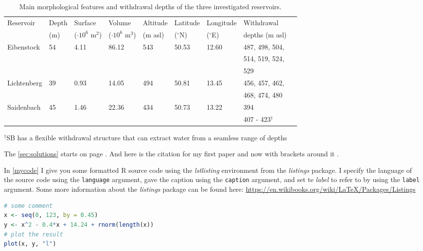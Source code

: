 \documentclass{article}
\numberwithin{equation}{section}
\begin{document}
	\begin{table}[b]
	\centering
	\caption{Main morphological features and withdrawal depths of the three investigated reservoirs.}
	\label{tab:mytable}
	\tiny
	\begin{tabular}{lllllllll}\hline
		Reservoir    & Depth & Surface   & Volume     & Altitude & Latitude    &
		Longitude  & Withdrawal \\
		&   	 (m)	 &	 ($\cdot 10^6$ m$^2$)     & ($\cdot10^6$ m$^3$)    &  (m asl)   &
		($^\circ$N) & ($^\circ$E) & depths (m asl)\\ \hline
		Eibenstock   &  54          & 4.11        & 86.12  & 543          & 50.53     & 12.60    & 487, 498, 504,  \\
		&&&&&&& 514, 519, 524,\\
		&&&&&&&  529\\
		Lichtenberg  &  39          & 0.93        & 14.05  &  494         & 50.81     & 13.45    & 456, 457, 462, \\
		&&&&&&& 468, 474, 480\\
		Saidenbach   &  45          & 1.46        & 22.36  &  434          & 50.73     & 13.22    & 394 \\
		&&&&&&& 407 - 423$^\dagger$\\ \hline
	\end{tabular}

	\raggedright

	{\tiny $^\dagger$SB has a flexible withdrawal structure that can extract water from a
		seamless range of depths}
\end{table}


The \autoref{sec:solutions} starts on page \pageref{sec:solutions}. And here is the citation for my first paper \citet{feldbauer_managing_2020} and now with brackets around it \citep{feldbauer_managing_2020}.


In \autoref{mycode} I give you some formatted R source code using the \textit{lstlisting} environment from the \textit{listings} package. I specify the language of the source code using the \texttt{language} argument, gave the caption using the \texttt{caption} argument, and set te \textit{label} to refer to by using the \texttt{label} argument. Some more information about the \textit{listings} package can be found here: \url{https://en.wikibooks.org/wiki/LaTeX/Packages/Listings}

\begin{lstlisting}[language=R, frame=single, caption=some code in R, label=mycode]
# some comment
x <- seq(0, 123, by = 0.45)
y <- x^2 - 0.4*x + 14.24 + rnorm(length(x))
# plot the result
plot(x, y, "l")
\end{lstlisting}
\end{document}
